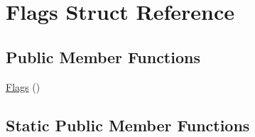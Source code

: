 \hypertarget{structtesting_1_1Flags}{\section{\-Flags \-Struct \-Reference}
\label{d6/d20/structtesting_1_1Flags}
}
\subsection*{\-Public \-Member \-Functions}
\begin{DoxyCompactItemize}
\item 
\hyperlink{structtesting_1_1Flags_a9d4763cab85470385da6310f3343fd88}{\-Flags} ()
\end{DoxyCompactItemize}
\subsection*{\-Static \-Public \-Member \-Functions}
